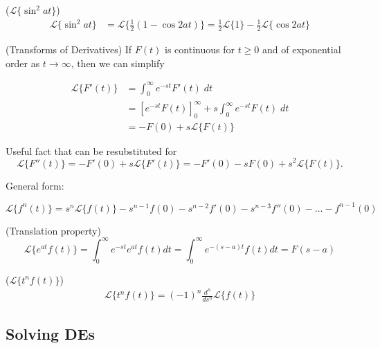 \begin{definition}($\mathcal{L}\{\sin^2 at\}$)
    \begin{align*}
        \mathcal{L}\{\sin^2 at\}&=\mathcal{L}\{\frac{1}{2}(1-\cos 2at)\}=\frac{1}{2}\mathcal{L}\{1\}-\frac{1}{2}\mathcal{L}\{\cos 2at\}
    \end{align*}
\end{definition}

\begin{definition}(Transforms of Derivatives)
    If $F(t)$ is continuous for $t\geq 0$ and of exponential order as $t\to \infty$, then we can simplify

    \begin{align*}
        \mathcal{L}\{F'(t)\}&=\int_0^\infty e^{-st}F'(t)\;dt\\
        &=\left[e^{-st}F(t)\right]_0^\infty+s\int_0^\infty e^{-st}F(t)\;dt\\
        &=-F(0)+s\mathcal{L}\{F(t)\}
    \end{align*}

    Useful fact that can be resubstituted for \[\mathcal{L}\{F''(t)\}=-F'(0)+s\mathcal{L}\{F'(t)\}=-F'(0)-sF(0)+s^2\mathcal{L}\{F(t)\}.\]

    General form:

    \begin{equation*}
        \mathcal{L}\{f^n(t)\}=s^n\mathcal{L}\{f(t)\}-s^{n-1}f(0)-s^{n-2}f'(0)-s^{n-3}f''(0)-\ldots-f^{n-1}(0)
    \end{equation*}
\end{definition}

\begin{definition}(Translation property)
    \begin{equation*}
        \mathcal{L}\{e^{at}f(t)\}=\int_0^\infty e^{-st}e^{at}f(t)dt=\int_0^\infty e^{-(s-a)t}f(t)dt=F(s-a)
    \end{equation*}
\end{definition}

\begin{definition}($\mathcal{L}\{t^nf(t)\}$)
    \begin{align*}
        \mathcal{L}\{t^nf(t)\}=(-1)^n\frac{d^n}{ds^n}\mathcal{L}\{f(t)\}
    \end{align*}    
\end{definition}

\subsection{Solving DEs}

